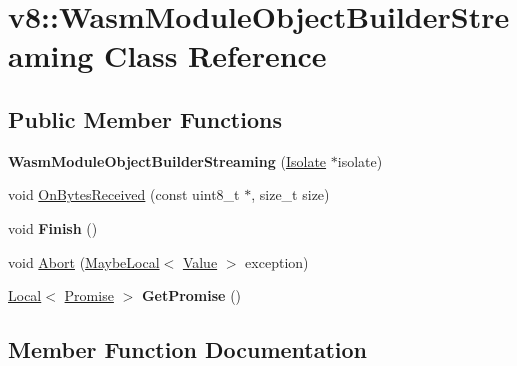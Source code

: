 \hypertarget{classv8_1_1WasmModuleObjectBuilderStreaming}{}\section{v8\+:\+:Wasm\+Module\+Object\+Builder\+Streaming Class Reference}
\label{classv8_1_1WasmModuleObjectBuilderStreaming}
\subsection*{Public Member Functions}
\begin{DoxyCompactItemize}
\item 
\mbox{\label{classv8_1_1WasmModuleObjectBuilderStreaming_a38ecb92cde61095525a4b2728ba091aa}} 
{\bfseries Wasm\+Module\+Object\+Builder\+Streaming} (\mbox{\hyperlink{classv8_1_1Isolate}{Isolate}} $\ast$isolate)
\item 
void \mbox{\hyperlink{classv8_1_1WasmModuleObjectBuilderStreaming_ac67b675b7241a18a3b773dab2f0fd458}{On\+Bytes\+Received}} (const uint8\+\_\+t $\ast$, size\+\_\+t size)
\item 
\mbox{\label{classv8_1_1WasmModuleObjectBuilderStreaming_a679a8781a81a4c926e82924d1a2f2446}} 
void {\bfseries Finish} ()
\item 
void \mbox{\hyperlink{classv8_1_1WasmModuleObjectBuilderStreaming_ac8a2a6e122799d746ded69f80a295fb5}{Abort}} (\mbox{\hyperlink{classv8_1_1MaybeLocal}{Maybe\+Local}}$<$ \mbox{\hyperlink{classv8_1_1Value}{Value}} $>$ exception)
\item 
\mbox{\label{classv8_1_1WasmModuleObjectBuilderStreaming_a1b5def1cfb9746d6e196a5a44ffe6308}} 
\mbox{\hyperlink{classv8_1_1Local}{Local}}$<$ \mbox{\hyperlink{classv8_1_1Promise}{Promise}} $>$ {\bfseries Get\+Promise} ()
\end{DoxyCompactItemize}


\subsection{Member Function Documentation}
\mbox{\label{classv8_1_1WasmModuleObjectBuilderStreaming_ac8a2a6e122799d746ded69f80a295fb5}} 
